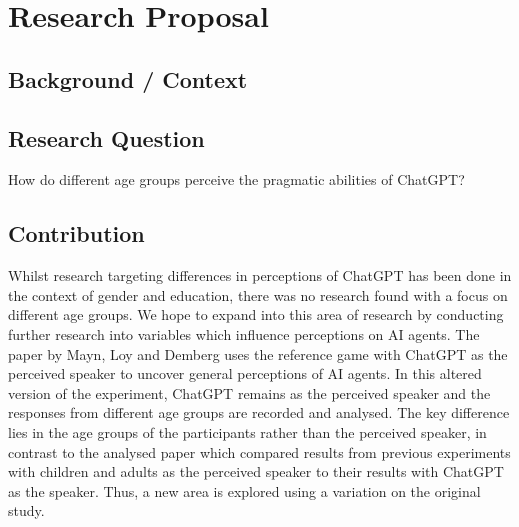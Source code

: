 \documentclass[12pt]{article}
\begin{document}



\section{Research Proposal}

\subsection{Background / Context}

\subsection{Research Question}
How do different age groups perceive the pragmatic abilities of ChatGPT?


\subsection{Contribution}
Whilst research targeting differences in perceptions of ChatGPT has been done in the context of gender and education, there was no research found with a focus on different age groups. We hope to expand into this area of research by conducting further research into variables which influence perceptions on AI agents. 
The paper by Mayn, Loy and Demberg uses the reference game with ChatGPT as the perceived speaker to uncover general perceptions of AI agents. In this altered version of the experiment, ChatGPT remains as the perceived speaker and the responses from different age groups are recorded and analysed. The key difference lies in the age groups of the participants rather than the perceived speaker, in contrast to the analysed paper which compared results from previous experiments with children and adults as the perceived speaker to their results with ChatGPT as the speaker. Thus, a new area is explored using a variation on the original study.
\end{document}
